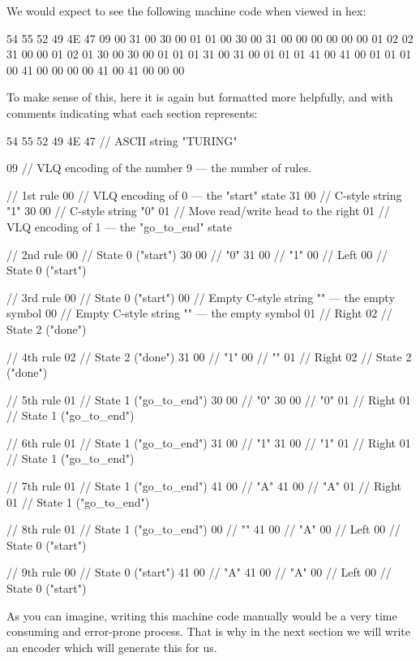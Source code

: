 We would expect to see the following machine code when viewed in hex:
\begin{stdout}
54 55 52 49 4E 47 09 00 31 00 30 00 01 01 00 30 00 31 00 00 00 00 00 00 01 02 02 31 00 00 01 02 01 30 00 30 00 01 01 01 31 00 31 00 01 01 01 41 00 41 00 01 01 01 00 41 00 00 00 00 41 00 41 00 00 00
\end{stdout}
To make sense of this, here it is again but formatted more helpfully, and with comments indicating what each section represents:
\begin{stdout}
54 55 52 49 4E 47       // ASCII string "TURING"

09                      // VLQ encoding of the number 9 — the number of rules.

                        // 1st rule
00                      // VLQ encoding of 0 — the "start" state
31 00                   // C-style string "1"
30 00                   // C-style string "0"
01                      // Move read/write head to the right
01                      // VLQ encoding of 1 — the "go_to_end" state

                        // 2nd rule 
00                      // State 0 ("start")
30 00                   // "0"
31 00                   // "1"
00                      // Left
00                      // State 0 ("start")

                        // 3rd rule
00                      // State 0 ("start")
00                      // Empty C-style string "" — the empty symbol
00                      // Empty C-style string "" — the empty symbol
01                      // Right
02                      // State 2 ("done")

                        // 4th rule
02                      // State 2 ("done")
31 00                   // "1"
00                      // ""
01                      // Right
02                      // State 2 ("done")

                        // 5th rule
01                      // State 1 ("go_to_end")
30 00                   // "0"
30 00                   // "0"
01                      // Right
01                      // State 1 ("go_to_end")

                        // 6th rule
01                      // State 1 ("go_to_end")
31 00                   // "1"
31 00                   // "1"
01                      // Right
01                      // State 1 ("go_to_end")

                        // 7th rule
01                      // State 1 ("go_to_end")
41 00                   // "A"
41 00                   // "A"
01                      // Right
01                      // State 1 ("go_to_end")

                        // 8th rule
01                      // State 1 ("go_to_end")
00                      // ""
41 00                   // "A"
00                      // Left
00                      // State 0 ("start")

                        // 9th rule
00                      // State 0 ("start")
41 00                   // "A"
41 00                   // "A"
00                      // Left
00                      // State 0 ("start")
\end{stdout}

As you can imagine, writing this machine code manually would be a very time consuming and error-prone process. That is why in the next section we will write an encoder which will generate this for us.